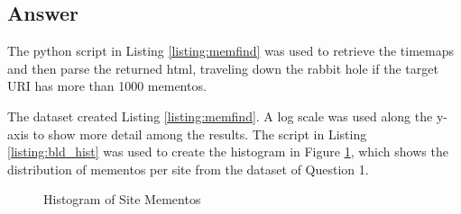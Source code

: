 \subsection{Answer}
The python script in Listing \ref{listing:memfind} was used to retrieve the timemaps and then parse the returned html, traveling down the rabbit hole if the target URI has more than 1000 mementos.



The dataset created Listing \ref{listing:memfind}. A log scale was used along the y-axis to show more detail among the results. The script in Listing \ref{listing:bld_hist} was used to create the histogram in Figure \ref{fig:hist_ss}, which shows the distribution of mementos per site from the dataset of Question 1.



\begin{figure}[h]
\centering
{}
\caption{Histogram of Site Mementos}
\label{fig:hist_ss}
\end{figure}
